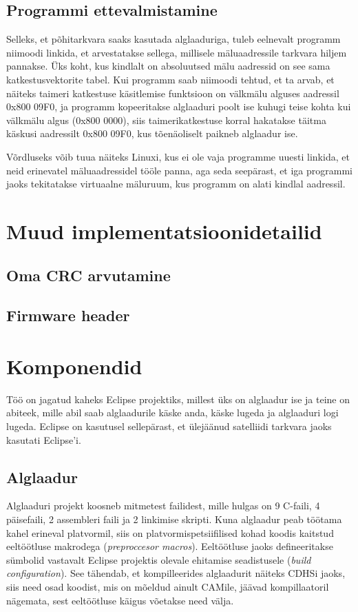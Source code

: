 \documentclass[12pt,a4paper]{article}
\begin{document}
\subsection{Programmi ettevalmistamine}
\label{sec:boot:prep}
Selleks, et põhitarkvara saaks kasutada alglaaduriga, tuleb eelnevalt programm
niimoodi linkida, et arvestatakse sellega, millisele mäluaadressile tarkvara
hiljem pannakse. Üks koht, kus kindlalt on absoluutsed mälu aadressid on see
sama katkestusvektorite tabel. Kui programm saab niimoodi tehtud, et ta arvab,
et näiteks taimeri katkestuse käsitlemise funktsioon on välkmälu alguses
aadressil 0x800 09F0, ja programm kopeeritakse alglaaduri poolt ise kuhugi teise
kohta kui välkmälu algus (0x800 0000), siis taimerikatkestuse korral hakatakse
täitma käskusi aadressilt 0x800 09F0, kus tõenäoliselt paikneb alglaadur ise.

Võrdluseks võib tuua näiteks Linuxi, kus ei ole vaja programme uuesti linkida,
et neid erinevatel mäluaadressidel tööle panna, aga seda seepärast, et iga
programmi jaoks tekitatakse virtuaalne mäluruum, kus programm on alati kindlal
aadressil.

\section{Muud implementatsioonidetailid}
\subsection{Oma CRC arvutamine}
\subsection{Firmware header}

\section{Komponendid}
Töö on jagatud kaheks Eclipse projektiks, millest üks on alglaadur ise ja teine on
abiteek, mille abil saab alglaadurile käske anda, käske lugeda ja alglaaduri
logi lugeda. Eclipse on kasutusel sellepärast, et ülejäänud satelliidi tarkvara jaoks
kasutati Eclipse'i. 

\subsection{Alglaadur}
Alglaaduri projekt koosneb mitmetest failidest, mille hulgas on 9 C-faili, 4
päisefaili, 2 assembleri faili ja 2 linkimise skripti. Kuna alglaadur peab töötama kahel erineval
platvormil, siis on platvormispetsiifilised kohad koodis kaitstud eeltöötluse
makrodega (\textit{preproccesor macros}). Eeltöötluse jaoks defineeritakse
sümbolid vastavalt Eclipse projektis olevale ehitamise seadistusele
(\textit{build configuration}). See tähendab, et kompilleerides alglaadurit
näiteks CDHSi jaoks, siis need osad koodist, mis on mõeldud ainult CAMile,
jäävad kompillaatoril nägemata, sest eeltöötluse käigus võetakse need välja.
\end{document}

